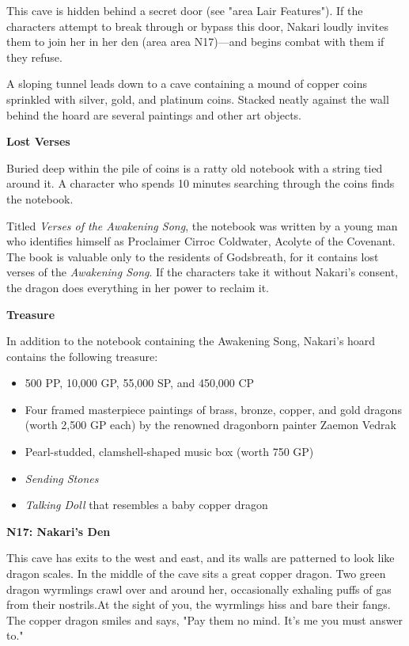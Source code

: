 \documentclass[letterpaper, 11pt, twocolumn]{dndbook}
\begin{document}
This cave is hidden behind a secret door (see "area Lair Features"). If the characters attempt to break through or bypass this door, Nakari loudly invites them to join her in her den (area area N17)---and begins combat with them if they refuse.

\begin{DndReadAloud}
A sloping tunnel leads down to a cave containing a mound of copper coins sprinkled with silver, gold, and platinum coins. Stacked neatly against the wall behind the hoard are several paintings and other art objects.
\end{DndReadAloud}

\textbf{Lost Verses}

Buried deep within the pile of coins is a ratty old notebook with a string tied around it. A character who spends 10 minutes searching through the coins finds the notebook.

Titled \textit{Verses of the Awakening Song}, the notebook was written by a young man who identifies himself as Proclaimer Cirroc Coldwater, Acolyte of the Covenant. The book is valuable only to the residents of Godsbreath, for it contains lost verses of the \textit{Awakening Song}. If the characters take it without Nakari's consent, the dragon does everything in her power to reclaim it.

\textbf{Treasure}

In addition to the notebook containing the Awakening Song, Nakari's hoard contains the following treasure:

\begin{itemize}
\item 500 PP, 10,000 GP, 55,000 SP, and 450,000 CP
\item Four framed masterpiece paintings of brass, bronze, copper, and gold dragons (worth 2,500 GP each) by the renowned dragonborn painter Zaemon Vedrak
\item Pearl-studded, clamshell-shaped music box (worth 750 GP)
\item \textit{Sending Stones}
\item \textit{Talking Doll} that resembles a baby copper dragon
\end{itemize}

\textbf{N17: Nakari's Den}

\begin{DndReadAloud}
This cave has exits to the west and east, and its walls are patterned to look like dragon scales. In the middle of the cave sits a great copper dragon. Two green dragon wyrmlings crawl over and around her, occasionally exhaling puffs of gas from their nostrils.At the sight of you, the wyrmlings hiss and bare their fangs. The copper dragon smiles and says, "Pay them no mind. It's me you must answer to."
\end{DndReadAloud}
\end{document}
